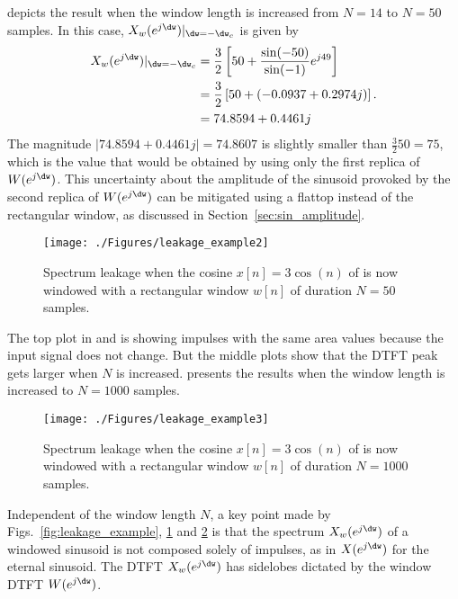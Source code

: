  depicts the result when the window length is increased from $N=14$ to $N=50$ samples. In this 
case, $X_w(e^{j \dw})|_{\dw=-\dw_c}$ is given by
\begin{align}
	X_w(e^{j \dw})|_{\dw=-\dw_c} &= \frac{3}{2} \left[50 + \frac{\sin(-50)}{\sin(-1)} e^{j 49}\right] \nonumber \\
	&= \frac{3}{2} \left[50 + (-0.0937 + 0.2974j) \right]. \nonumber \\
	&= 74.8594 + 0.4461j \nonumber
\end{align}
The magnitude $|74.8594 + 0.4461j|=74.8607$ is slightly smaller than $\frac{3}{2}50=75$, which is the value that would be obtained by using only the first replica of $W(e^{j \dw})$. This uncertainty about the amplitude of the sinusoid provoked by the second replica of $W(e^{j \dw})$ can be mitigated using a flattop instead of the rectangular window, as discussed in Section~\ref{sec:sin_amplitude}.

\begin{figure}[htbp]
\centering
\texttt{[image: ./Figures/leakage\_example2]}
\caption{Spectrum leakage when the cosine $x[n]=3 \cos(n)$ of  is now windowed with a
rectangular window $w[n]$ of duration $N=50$ samples.\label{fig:leakage_example2}}
\end{figure}

The top plot in  and  is showing impulses with the same area values because
the input signal does not change.
But the middle plots show that the DTFT peak gets larger when $N$ is increased.
 presents the results when the window length is increased to $N=1000$ samples.

\begin{figure}[htbp]
\centering
\texttt{[image: ./Figures/leakage\_example3]}
\caption{Spectrum leakage when the cosine $x[n]=3 \cos(n)$ of  is now windowed with a
rectangular window $w[n]$ of duration $N=1000$ samples.\label{fig:leakage_example3}}
\end{figure}

Independent of the window length $N$, a key point made by Figs.~\ref{fig:leakage_example},
\ref{fig:leakage_example2} and \ref{fig:leakage_example3} is that
the spectrum $X_w(e^{j \dw})$ of a windowed sinusoid is not composed solely of impulses, as in $X(e^{j \dw})$ for the eternal sinusoid.
The DTFT $X_w(e^{j \dw})$ has sidelobes dictated by the window DTFT $W(e^{j \dw})$.
\eExample

